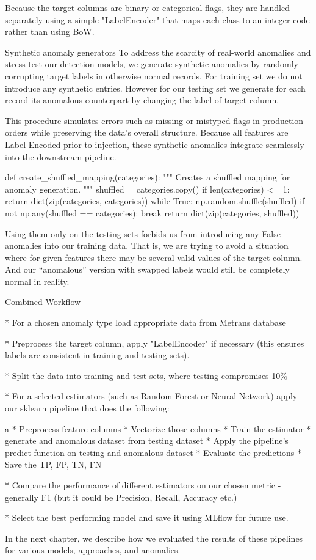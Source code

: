 Because the target columns are binary or categorical flags, they are handled separately using a simple "LabelEncoder" that maps each class to an integer code rather than using BoW.

\secc Synthetic anomaly generators
To address the scarcity of real-world anomalies and stress-test our detection models, we generate synthetic anomalies by randomly corrupting target labels in otherwise normal records. For training set we do not introduce any synthetic entries. However for our testing set we generate for each record its anomalous counterpart by changing the label of target column.

This procedure simulates errors such as missing or mistyped flags in production orders while preserving the data’s overall structure. Because all features are Label-Encoded prior to injection, these synthetic anomalies integrate seamlessly into the downstream pipeline.

\begtt {}
def create_shuffled_mapping(categories):
    """
    Creates a shuffled mapping for anomaly generation.
    """
    shuffled = categories.copy()
    if len(categories) <= 1:
        return dict(zip(categories, categories))
    while True:
        np.random.shuffle(shuffled)
        if not np.any(shuffled == categories):
            break
    return dict(zip(categories, shuffled))
\endtt

Using them only on the testing sets forbids us from introducing any False anomalies into our training data. That is, we are trying to avoid a situation where for given features there may be several valid values of the target column. And our ``anomalous'' version with swapped labels would still be completely normal in reality.

\sec Combined Workflow

\begitems
* For a chosen anomaly type load appropriate data from Metrans database

* Preprocess the target column, apply "LabelEncoder" if necessary (this ensures labels are consistent in training and testing sets).

* Split the data into training and test sets, where testing compromises 10\%

* For a selected estimators (such as Random Forest or Neural Network) apply our sklearn pipeline that does the following:

\begitems \style a
* Preprocess feature columns
* Vectorize those columns
* Train the estimator
* generate and anomalous dataset from testing dataset
* Apply the pipeline's predict function on testing and anomalous dataset
* Evaluate the predictions
* Save the TP, FP, TN, FN
\enditems

* Compare the performance of different estimators on our chosen metric - generally 
 F1 (but it could be Precision, Recall, Accuracy etc.)

 * Select the best performing model and save it using MLflow for future use.
\enditems

In the next chapter, we describe how we evaluated the results of these pipelines for various models, approaches, and anomalies.